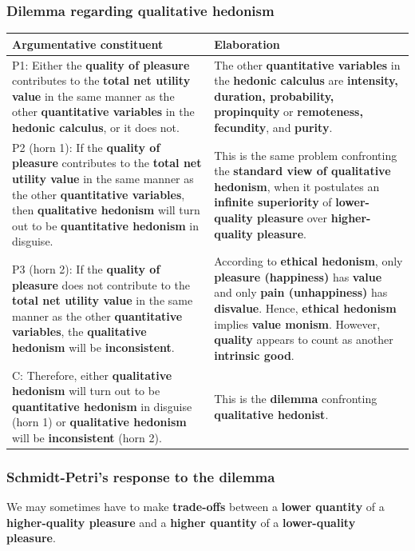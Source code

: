 \documentclass[11pt]{article}
\begin{document}
\subsubsection{Dilemma regarding qualitative hedonism}
\label{sec:org8cf5f1f}
\begin{center}
\begin{tabularx}{\textwidth}{|X|X|}
\hline
Argumentative constituent & Elaboration\\
\hline
P1: Either the \textbf{quality of pleasure} contributes to the \textbf{total net utility value} in the same manner as the other \textbf{quantitative variables} in the \textbf{hedonic calculus}, or it does not. & The other \textbf{quantitative variables} in the \textbf{hedonic calculus} are \textbf{intensity, duration, probability, propinquity} or \textbf{remoteness, fecundity}, and \textbf{purity}.\\
\hline
P2 (horn 1): If the \textbf{quality of pleasure} contributes to the \textbf{total net utility value} in the same manner as the other \textbf{quantitative variables}, then \textbf{qualitative hedonism} will turn out to be \textbf{quantitative hedonism} in disguise. & This is the same problem confronting the \textbf{standard view of qualitative hedonism}, when it postulates an \textbf{infinite superiority} of \textbf{lower-quality pleasure} over \textbf{higher-quality pleasure}.\\
P3 (horn 2): If the \textbf{quality of pleasure} does not contribute to the \textbf{total net utility value} in the same manner as the other \textbf{quantitative variables}, the \textbf{qualitative hedonism} will be \textbf{inconsistent}. & According to \textbf{ethical hedonism}, only \textbf{pleasure (happiness)} has \textbf{value} and only \textbf{pain (unhappiness)} has \textbf{disvalue}. Hence, \textbf{ethical hedonism} implies \textbf{value monism}. However, \textbf{quality} appears to count as another \textbf{intrinsic good}.\\
\hline
C: Therefore, either \textbf{qualitative hedonism} will turn out to be \textbf{quantitative hedonism} in disguise (horn 1) or \textbf{qualitative hedonism} will be \textbf{inconsistent} (horn 2). & This is the \textbf{dilemma} confronting \textbf{qualitative hedonist}.\\
\hline
\end{tabularx}
\end{center}

 \newpage
\subsubsection{Schmidt-Petri's response to the dilemma}
\label{sec:org5c951b7}
We may sometimes have to make \textbf{trade-offs} between a \textbf{lower quantity} of a \textbf{higher-quality pleasure} and a \textbf{higher quantity} of a \textbf{lower-quality pleasure}.
\end{document}
